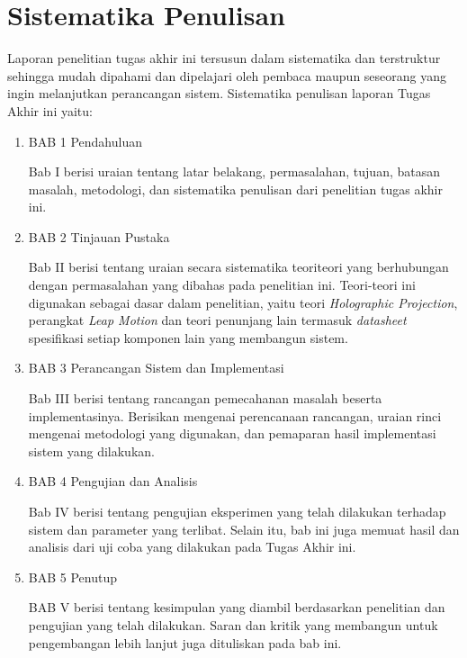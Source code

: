 \section{Sistematika Penulisan}
\vspace{1ex}
	Laporan penelitian tugas akhir ini tersusun dalam sistematika dan terstruktur sehingga mudah dipahami dan dipelajari oleh pembaca maupun seseorang yang ingin melanjutkan perancangan sistem. Sistematika penulisan laporan Tugas Akhir ini yaitu:
	\vspace{0.5ex}
	\begin{enumerate}[nolistsep]
		\item BAB 1 Pendahuluan
		
		Bab I berisi uraian tentang latar belakang, permasalahan, tujuan, batasan masalah, metodologi, dan sistematika penulisan dari penelitian tugas akhir ini.
		\vspace{0.5ex}
	
		\item BAB 2 Tinjauan Pustaka
	
		Bab II berisi tentang uraian secara sistematika teoriteori yang berhubungan dengan permasalahan yang dibahas pada penelitian ini. Teori-teori ini digunakan sebagai dasar dalam penelitian, yaitu teori \textit{Holographic Projection}, perangkat \textit{Leap Motion} dan teori penunjang lain termasuk \textit{datasheet} spesifikasi setiap komponen lain yang membangun sistem.
		\vspace{0.5ex}
	
		\item BAB 3 Perancangan Sistem dan Implementasi
	
		Bab III berisi tentang rancangan pemecahanan masalah beserta implementasinya. Berisikan mengenai perencanaan rancangan, uraian rinci mengenai metodologi yang digunakan, dan pemaparan hasil implementasi sistem yang dilakukan. 
		\vspace{0.5ex}
	
		\item BAB 4 Pengujian dan Analisis
	
		Bab IV berisi tentang pengujian eksperimen yang telah dilakukan terhadap sistem dan parameter yang terlibat. Selain itu, bab ini juga memuat hasil dan analisis dari uji coba yang dilakukan pada Tugas Akhir ini.
		\vspace{0.5ex}
		
		\item BAB 5 Penutup
		
		BAB V berisi tentang kesimpulan yang diambil berdasarkan penelitian dan pengujian yang telah dilakukan. Saran dan kritik yang membangun untuk pengembangan lebih lanjut juga dituliskan pada bab ini.
		\vspace{0.5ex}
	\end{enumerate}
\vspace{2ex}

\begin{comment}
\section{Relevansi}
\vspace{1ex}
	Penelitian Tugas Akhir ini mengenai \colorbox{yellow}{cari tau ini tentang apa isinya, kalau dari PedomanTA isinya Manfaat TA}
\vspace{2ex}
\end{comment}